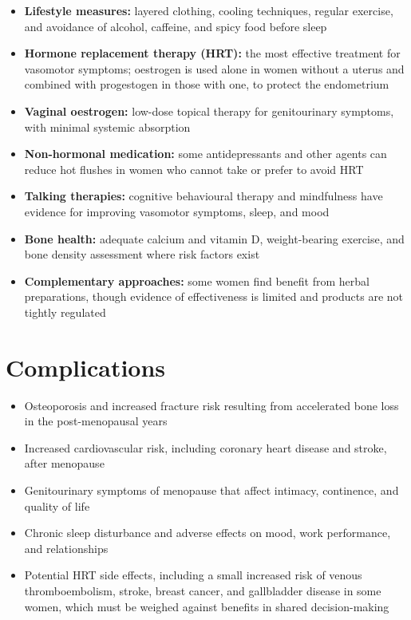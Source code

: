 \begin{itemize}
    \item \textbf{Lifestyle measures:} layered clothing, cooling techniques, regular exercise, and avoidance of alcohol, caffeine, and spicy food before sleep
    \item \textbf{Hormone replacement therapy (HRT):} the most effective treatment for vasomotor symptoms; oestrogen is used alone in women without a uterus and combined with progestogen in those with one, to protect the endometrium
    \item \textbf{Vaginal oestrogen:} low-dose topical therapy for genitourinary symptoms, with minimal systemic absorption
    \item \textbf{Non-hormonal medication:} some antidepressants and other agents can reduce hot flushes in women who cannot take or prefer to avoid HRT
    \item \textbf{Talking therapies:} cognitive behavioural therapy and mindfulness have evidence for improving vasomotor symptoms, sleep, and mood
    \item \textbf{Bone health:} adequate calcium and vitamin D, weight-bearing exercise, and bone density assessment where risk factors exist
    \item \textbf{Complementary approaches:} some women find benefit from herbal preparations, though evidence of effectiveness is limited and products are not tightly regulated
\end{itemize}

\section*{Complications}
\begin{itemize}
    \item Osteoporosis and increased fracture risk resulting from accelerated bone loss in the post-menopausal years
    \item Increased cardiovascular risk, including coronary heart disease and stroke, after menopause
    \item Genitourinary symptoms of menopause that affect intimacy, continence, and quality of life
    \item Chronic sleep disturbance and adverse effects on mood, work performance, and relationships
    \item Potential HRT side effects, including a small increased risk of venous thromboembolism, stroke, breast cancer, and gallbladder disease in some women, which must be weighed against benefits in shared decision-making
\end{itemize}

